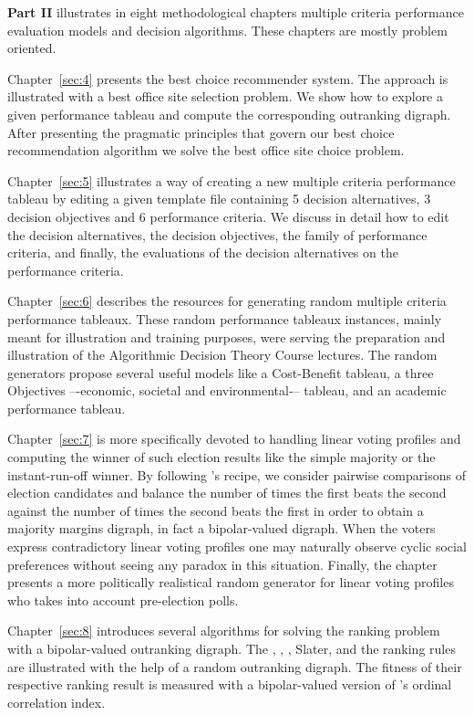 \textbf{Part II} illustrates in eight methodological chapters multiple criteria performance evaluation models and decision algorithms. These chapters are mostly problem oriented.

Chapter~\ref{sec:4} presents the \Rubis best choice recommender system. The approach is illustrated with a best office site selection problem. We show how to explore a given performance tableau and compute the corresponding outranking digraph. After presenting the pragmatic principles that govern our best choice recommendation algorithm we solve the best office site choice problem.

Chapter~\ref{sec:5} illustrates a way of creating a new multiple criteria performance tableau by editing a given template file containing 5 decision alternatives, 3 decision objectives and 6 performance criteria. We discuss in detail how to edit the decision alternatives, the decision objectives, the family of performance criteria, and finally, the evaluations of the decision alternatives on the performance criteria.

Chapter~\ref{sec:6} describes the \Digraph resources for generating random multiple criteria performance tableaux. These random performance tableaux instances, mainly meant for illustration and training purposes, were serving the preparation and illustration of the Algorithmic Decision Theory Course lectures. The random generators propose several useful models like a Cost-Benefit tableau, a three Objectives –-economic, societal and environmental-– tableau, and an academic performance tableau.

Chapter~\ref{sec:7} is more specifically devoted to handling linear voting profiles and computing the winner of such election results like the simple majority or the instant-run-off winner. By following \Condorcet 's recipe, we consider pairwise comparisons of election candidates and balance the number of times the first beats the second against the number of times the second beats the first in order to obtain a majority margins digraph, in fact a bipolar-valued digraph. When the voters express contradictory linear voting profiles one may naturally observe cyclic social preferences without seeing any paradox in this situation. Finally, the chapter presents a more politically realistical random generator for linear voting profiles who takes into account pre-election polls.

Chapter~\ref{sec:8} introduces several algorithms for solving the ranking problem with a bipolar-valued outranking digraph. The \Copeland, \NetFlows, \Kemeny, {\sc Sla\-ter}, \Kohler and the \RankedPairs ranking rules are illustrated with the help of a random outranking digraph. The fitness of their respective ranking result is measured with a bipolar-valued version of \Kendall 's ordinal correlation index.

